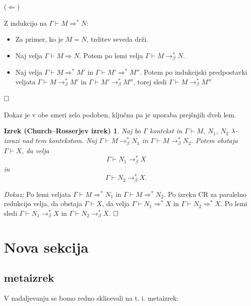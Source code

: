 \documentclass{article}
\def\qed{$\hfill\Box$}   %
\newtheorem{izrek_crosser}{Izrek (Church–Rosserjev izrek)}
\begin{document}
(\(\Leftarrow\))

Z indukcijo na \(\Gamma \vdash M \Rightarrow^* N\):


\begin{itemize}
    \item Za primer, ko je \(M = N\), trditev seveda drži.
    \item Naj velja \(\Gamma \vdash M \Rightarrow N\). Potem po lemi velja \(\Gamma \vdash M \rightarrow_\beta^* N\).
    \item Naj velja \(\Gamma \vdash M \Rightarrow^* M'\) in \(\Gamma \vdash M' \Rightarrow^* M''\). Potem po indukcijski predpostavki veljata \(\Gamma \vdash M \rightarrow_\beta^* M'\) in \(\Gamma \vdash M' \rightarrow_\beta^* M''\), torej sledi \(\Gamma \vdash M \rightarrow_\beta^* M''\)
\end{itemize}

\qed

Dokaz je v obe smeri zelo podoben, ključna pa je uporaba prejšnjih dveh lem.

\begin{izrek_crosser}
    Naj bo \(\Gamma\) kontekst in \(\Gamma \vdash M,\ N_1,\ N_2\) \(\lambda\)-izrazi nad tem kontekstom. Naj \(\Gamma \vdash M \rightarrow_\beta^* N_1\) in \(\Gamma \vdash M \rightarrow_\beta^* N_2\). Potem obstaja \(\Gamma \vdash X\), da velja
    \[
        \Gamma \vdash N_1 \rightarrow_\beta^* X
    \]
    in
    \[
        \Gamma \vdash N_2 \rightarrow_\beta^* X.
    \]
\end{izrek_crosser}


\noindent
{\em Dokaz:\/}
Po lemi veljata \(\Gamma \vdash M \Rightarrow^* N_1\) in \(\Gamma \vdash M \Rightarrow^* N_2\). Po izreku CR za paralelno redukcijo velja, da obstaja \(\Gamma \vdash X\), da velja \(\Gamma \vdash N_1 \Rightarrow^* X\) in \(\Gamma \vdash N_2 \Rightarrow^* X\). Po lemi sledi \(\Gamma \vdash N_1 \rightarrow_\beta^* X\) in \(\Gamma \vdash N_2 \rightarrow_\beta^* X\). \qed


\newpage

\section{Nova sekcija}

\subsection{metaizrek}

V nadaljevanju se bomo redno sklicevali na t. i. metaizrek: 
\end{document}
